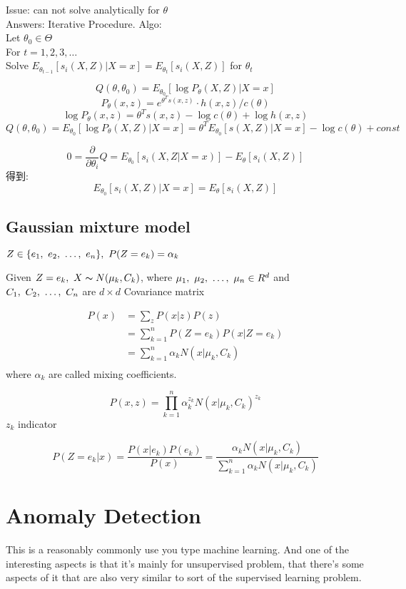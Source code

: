 \documentclass{article}
\begin{document}
\noindent
Issue: can not solve analytically for $\theta$\\
Answers: Iterative Procedure.
Algo: \\
Let $\theta_0 \in \Theta$ \\
For $t = 1,2,3, \ldots$\\
\quad Solve $E_{\theta_{t-1}}[s_i(X,Z)|X=x] = E_{\theta_t}[s_i(X,Z)]$ for $\theta_t$

$$ Q(\theta, \theta_0) = E_{\theta_0}[\log P_\theta(X,Z)|X=x] $$
$$P_\theta(x,z) = e^{\theta^T s(x,z)} \cdot h(x,z) / c(\theta)$$
$$\log P_\theta(x,z) = \theta^T s(x,z) - \log c(\theta) + \log h(x,z)$$
$$ 
Q(\theta, \theta_0) 
= E_{\theta_0}[\log P_\theta(X,Z)|X=x] 
= \theta^T E_{\theta_0}[s(X,Z)|X=x] - \log c(\theta) + const
$$

$$ 0 = \dfrac{\partial }{\partial \theta_i} Q = E_{\theta_0}[s_i(X,Z|X=x)] - E_\theta[s_i(X,Z)] $$
得到:
$$ E_{\theta_0}[s_i(X,Z)|X=x] = E_\theta[s_i(X,Z)] $$

\subsection{Gaussian mixture model}
$Z \in \{e_1,~e_2,~\ldots,~e_n\},\ P(Z = e_k) = \alpha_k$

Given $Z = e_k,\ X \thicksim{N}(\mu_k, C_k)$, where $\mu_1,~\mu_2,~\ldots,~\mu_n \in R^d$ and $C_1,~C_2,~\ldots,~C_n$ are $d \times d$ Covariance matrix

$$
\begin{aligned}
P(x)
& = \sum_z P(x|z)P(z) \\
& = \sum_{k=1}^n P(Z=e_k) P(x|Z = e_k)\\
& = \sum_{k=1}^n \alpha_k N(x|\mu_k,C_k) \\
\end{aligned}
$$
where $\alpha_k$ are called mixing coefficients.

$$
P(x,z) = \prod_{k=1}^n \alpha_k^{z_k} N(x|\mu_k, C_k)^{z_k}
$$
$z_k$ indicator

$$
P(Z=e_k|x) = \dfrac{P(x|e_k) P(e_k)}{P(x)} =  \dfrac{\alpha_k N(x|\mu_k,C_k)}{\sum_{k=1}^n \alpha_k N(x|\mu_k,C_k)}
$$

\section{Anomaly Detection}
This is a reasonably commonly use you type machine learning. 
And one of the interesting aspects is that it's mainly for unsupervised problem, that there's some aspects of it that are also very similar to sort of the supervised learning problem.
\end{document}
